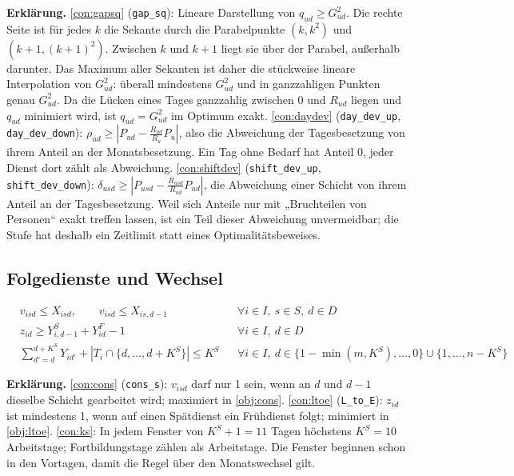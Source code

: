 \documentclass[11pt]{combiArticle}
\newcommand{\code}[1]{\texttt{#1}}
\begin{document}
\textbf{Erklärung.}
\eqref{con:gapsq} (\code{gap\_sq}): Lineare Darstellung von $q_{ud} \ge G_{ud}^2$. Die rechte Seite ist für
jedes $k$ die Sekante durch die Parabelpunkte $(k, k^2)$ und $(k+1, (k+1)^2)$. Zwischen $k$ und $k+1$ liegt sie
über der Parabel, außerhalb darunter. Das Maximum aller Sekanten ist daher die stückweise lineare Interpolation
von $G_{ud}^2$: überall mindestens $G_{ud}^2$ und in ganzzahligen Punkten genau $G_{ud}^2$. Da die Lücken eines
Tages ganzzahlig zwischen $0$ und $R_{ud}$ liegen und $q_{ud}$ minimiert wird, ist $q_{ud} = G_{ud}^2$ im
Optimum exakt.
\eqref{con:daydev} (\code{day\_dev\_up}, \code{day\_dev\_down}): $\rho_{ud} \ge |P_{ud} - \frac{R_{ud}}{R_u}
P_u|$, also die Abweichung der Tagesbesetzung von ihrem Anteil an der Monatsbesetzung. Ein Tag ohne Bedarf
hat Anteil 0, jeder Dienst dort zählt als Abweichung.
\eqref{con:shiftdev} (\code{shift\_dev\_up}, \code{shift\_dev\_down}): $\delta_{usd} \ge |P_{usd} -
\frac{R_{usd}}{R_{ud}} P_{ud}|$, die Abweichung einer Schicht von ihrem Anteil an der Tagesbesetzung. Weil
sich Anteile nur mit „Bruchteilen von Personen“ exakt treffen lassen, ist ein Teil dieser Abweichung
unvermeidbar; die Stufe hat deshalb ein Zeitlimit statt eines Optimalitätsbeweises.

\subsection{Folgedienste und Wechsel}

\begin{align}
  & v_{isd} \le X_{isd},\qquad v_{isd} \le X_{is,d-1} && \forall i \in I,\ s \in S,\ d \in D \label{con:cons}\\
  & z_{id} \ge Y^{S}_{i,d-1} + Y^{F}_{id} - 1 && \forall i \in I,\ d \in D \label{con:ltoe}\\
  & \textstyle\sum_{d' = d}^{d + K^{S}} Y_{id'} + |T_i \cap \{d,\dots,d+K^{S}\}| \le K^{S}
    && \forall i \in I,\ d \in \{1-\min(m,K^{S}),\dots,0\} \cup \{1,\dots,n-K^{S}\} \label{con:ks}
\end{align}

\textbf{Erklärung.}
\eqref{con:cons} (\code{cons\_s}): $v_{isd}$ darf nur 1 sein, wenn an $d$ und $d-1$ dieselbe Schicht gearbeitet
wird; maximiert in \eqref{obj:cons}.
\eqref{con:ltoe} (\code{L\_to\_E}): $z_{id}$ ist mindestens 1, wenn auf einen Spätdienst ein Frühdienst
folgt; minimiert in \eqref{obj:ltoe}.
\eqref{con:ks}: In jedem Fenster von $K^{S}+1 = 11$ Tagen höchstens $K^{S} = 10$ Arbeitstage; Fortbildungstage
zählen als Arbeitstage. Die Fenster beginnen schon in den Vortagen, damit die Regel über den Monatswechsel gilt.
\end{document}
